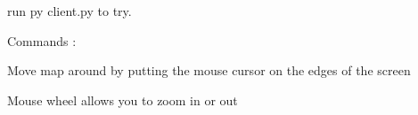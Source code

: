 run {\ttfamily py client.\+py} to try.

Commands \+:
\begin{DoxyItemize}
\item Move map around by putting the mouse cursor on the edges of the screen
\item Mouse wheel allows you to zoom in or out 
\end{DoxyItemize}